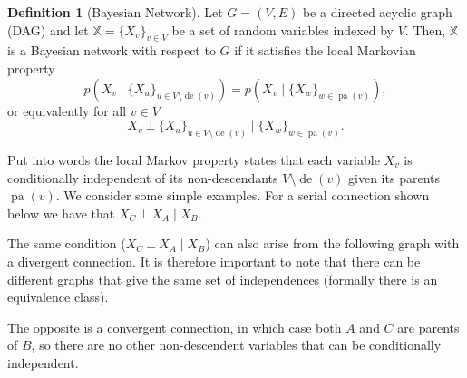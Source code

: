 \documentclass[a4paper]{article}
\newcommand{\given}{\mid}
\newcommand{\ind}{~\bot~} %
\DeclareMathOperator{\pa}{pa} %
\DeclareMathOperator{\de}{de} %
\theoremstyle{plain}
\theoremstyle{definition}
\newtheorem{defn}{Definition}[section]
\theoremstyle{remark}
\begin{document}
\begin{defn}[Bayesian Network]
  Let $G = (V,E)$ be a directed acyclic graph (DAG) and let $\mathbb{X} =
  \{X_v\}_{v \in V}$ be a set of random variables indexed by $V$. Then,
  $\mathbb{X}$ is a Bayesian network with respect to $G$ if it satisfies the
  local Markovian property
  \[
    p(\bar{X}_v \given \{\bar{X}_u\}_{u \in V \setminus \de(v)})
    = p(\bar{X}_v \given \{\bar{X}_w\}_{w \in \pa(v)}),
  \]
  or equivalently for all $v \in V$
  \[
    X_v \ind \{X_u\}_{u \in V \setminus \de(v)} \given \{X_w\}_{w \in \pa(v)}.
  \]
\end{defn}
Put into words the local Markov property states that each variable $X_v$ is
conditionally independent of its non-descendants $V \setminus \de(v)$ given its
parents $\pa(v)$. We consider some simple examples. For a serial connection
shown below we have that $X_C \ind X_A \given X_B$.

\begin{center}
\end{center}

The same condition ($X_C \ind X_A \given X_B$) can also arise from the
following graph with a divergent connection. It is therefore important to note
that there can be different graphs that give the same set of independences
(formally there is an equivalence class).

\begin{center}
\end{center}

The opposite is a convergent connection, in which case both $A$ and $C$ are
parents of $B$, so there are no other non-descendent variables that can be
conditionally independent.

\begin{center}
\end{center}
\end{document}
